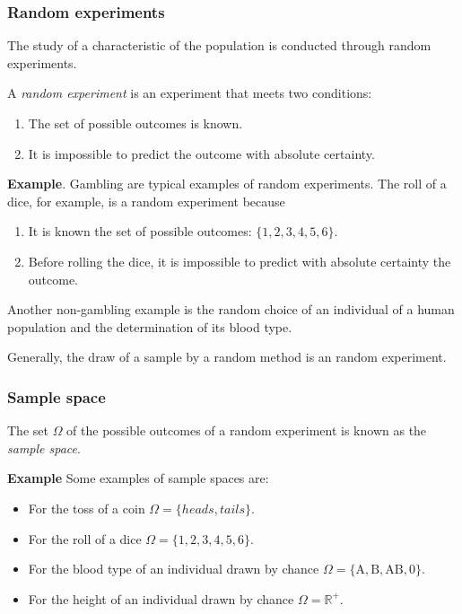 \begin{frame}
\frametitle{Random experiments}
The study of a characteristic of the population is conducted through random experiments. 

\begin{definition} A \emph{random experiment} is an experiment that meets two conditions:
\begin{enumerate}
\item The set of possible outcomes is known. 
\item It is impossible to predict the outcome with absolute certainty.
\end{enumerate} 
\end{definition}

\textbf{Example}. Gambling are typical examples of random experiments. 
The roll of a dice, for example, is a random experiment because
\begin{enumerate}
\item It is known the set of possible outcomes: $\{1,2,3,4,5,6\}$.
\item Before rolling the dice, it is impossible to predict with absolute certainty the outcome. 
\end{enumerate}

Another non-gambling example is the random choice of an individual of a human population and the determination of its blood type. 

Generally, the draw of a sample by a random method  is an random experiment.
\end{frame}


\begin{frame}
\frametitle{Sample space}
\begin{definition}
The set $\Omega$ of the possible outcomes of a random experiment is known as the \emph{sample space}.
\end{definition}

\textbf{Example} Some examples of sample spaces are:
\begin{itemize}
\item For the toss of a coin $\Omega=\{heads,tails\}$.
\item For the roll of a dice $\Omega=\{1,2,3,4,5,6\}$.
\item For the blood type of an individual drawn by chance $\Omega=\{\mbox{A},\mbox{B},\mbox{AB},\mbox{0}\}$.
\item For the height of an individual drawn by chance $\Omega=\mathbb{R}^+$.
\end{itemize}
\end{frame}


